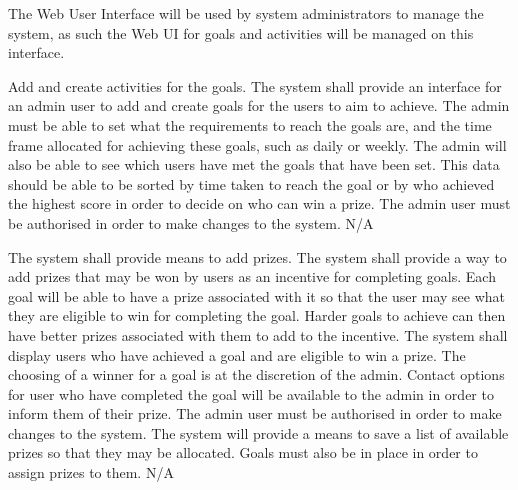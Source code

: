 The Web User Interface will be used by system administrators to manage the system, as such the Web UI for goals and activities will be managed on this interface.

\FuncReq
{Add and create activities for the goals.}
{The system shall provide an interface for an admin user to add and create goals for the users to aim to achieve. The admin must be able to set what the requirements to reach the goals are, and the time frame allocated for achieving these goals, such as daily or weekly. The admin will also be able to see which users have met the goals that have been set. This data should be able  to be sorted by time taken to reach the goal or by who achieved the highest score in order to decide on who can win a prize.}
{The admin user must be authorised in order to make changes to the system.}
{N/A}

\FuncReq
{The system shall provide means to add prizes.}
{The system shall provide a way to add prizes that may be won by users as an incentive for completing goals. Each goal will be able to have a prize associated with it so that the user may see what they are eligible to win for completing the goal. Harder goals to achieve can then have better prizes associated with them to add to the incentive. The system shall display users who have achieved a goal and are eligible to win a prize. The choosing of a winner for a goal is at the discretion of the admin. Contact options for user who have completed the goal will be available to the admin in order to inform them of their prize.}
{The admin user must be authorised in order to make changes to the system. The system will provide a means to save a list of available prizes so that they may be allocated. Goals must also be in place in order to assign prizes to them.}
{N/A}
